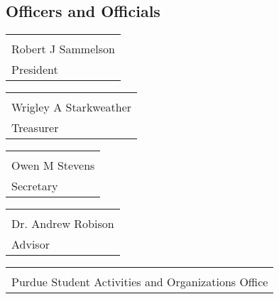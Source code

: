 \documentclass{article}
\begin{document}
\vspace{3ex}

\subsection*{Officers and Officials}

\vspace{10ex}

\noindent
\begin{minipage}{0.4\textwidth}
    \begin{tabular}{@{}p{\textwidth}@{}}
    \hrulefill \\
    Robert J Sammelson \\
    President \\
    \end{tabular}
\end{minipage}
\hfill
\begin{minipage}{0.4\textwidth}
    \begin{tabular}{@{}p{\textwidth}@{}}
    \hrulefill \\
    Wrigley A Starkweather \\
    Treasurer \\
    \end{tabular}
\end{minipage}

\vspace{10ex}

\noindent
\begin{minipage}{0.4\textwidth}
    \begin{tabular}{@{}p{\textwidth}@{}}
    \hrulefill \\
    Owen M Stevens \\
    Secretary \\
    \end{tabular}
\end{minipage}
\hfill
\begin{minipage}{0.4\textwidth}
    \noindent
    \begin{tabular}{@{}p{\textwidth}@{}}
    \hrulefill \\
    Dr. Andrew Robison \\
    Advisor \\
    \end{tabular}
\end{minipage}

\vspace{10ex}

\noindent
\begin{tabular}{@{}p{3.5in}@{}}
\hrulefill \\
Purdue Student Activities and Organizations Office \\
\end{tabular}
\end{document}
